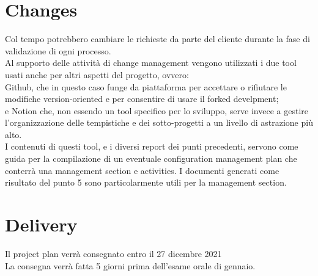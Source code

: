 \documentclass{article}
\begin{document}
\section{Changes}
Col tempo potrebbero cambiare le richieste da parte del cliente durante la fase di validazione di ogni processo.
\\Al supporto delle attività di change management vengono utilizzati i due tool usati anche per altri aspetti del progetto, ovvero: 
\\Github, che in questo caso funge da piattaforma per accettare o rifiutare le modifiche version-oriented e per consentire di usare il forked develpment; 
\\e Notion che, non essendo un tool specifico per lo sviluppo, serve invece a gestire l’organizzazione delle tempistiche e dei sotto-progetti a un livello di astrazione più alto.
\\I contenuti di questi tool, e i diversi report dei punti precedenti, servono come guida per la compilazione di un eventuale configuration management plan che conterrà una management section e activities. I documenti generati come risultato del punto 5 sono particolarmente utili per la management section.

\section{Delivery}
Il project plan verrà consegnato entro il 27 dicembre 2021
\\La consegna verrà fatta 5 giorni prima dell'esame orale di gennaio.
\end{document}
